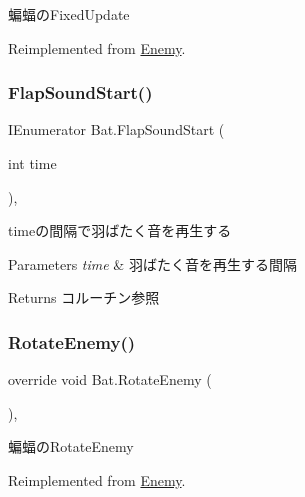 蝙蝠の\+Fixed\+Update 



Reimplemented from \hyperlink{class_enemy_ab19a73003a5b443ba93f4b6a45c0abad}{Enemy}.

\mbox{\label{class_bat_a84946382d9226014374a238b1d08cff4}} 
\subsubsection{\texorpdfstring{Flap\+Sound\+Start()}{FlapSoundStart()}}
{\footnotesize\ttfamily I\+Enumerator Bat.\+Flap\+Sound\+Start (\begin{DoxyParamCaption}\item[{int}]{time }\end{DoxyParamCaption})\hspace{0.3cm}{\ttfamily [inline]}, {\ttfamily [private]}}



timeの間隔で羽ばたく音を再生する 


\begin{DoxyParams}{Parameters}
{\em time} & 羽ばたく音を再生する間隔\\
\hline
\end{DoxyParams}
\begin{DoxyReturn}{Returns}
コルーチン参照
\end{DoxyReturn}
\mbox{\label{class_bat_a94ef7dfdaf7801f5fa36af5ece127fe1}} 
\subsubsection{\texorpdfstring{Rotate\+Enemy()}{RotateEnemy()}}
{\footnotesize\ttfamily override void Bat.\+Rotate\+Enemy (\begin{DoxyParamCaption}{ }\end{DoxyParamCaption})\hspace{0.3cm}{\ttfamily [inline]}, {\ttfamily [virtual]}}



蝙蝠の\+Rotate\+Enemy 



Reimplemented from \hyperlink{class_enemy_a2a0e665070fd362bd3ab2f2962ebff93}{Enemy}.



